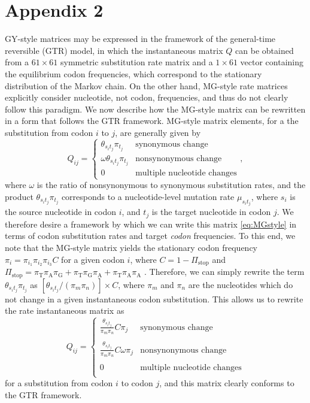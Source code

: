 \documentclass[11pt]{article}
\begin{document}
\section*{Appendix 2}
GY-style matrices may be expressed in the framework of the general-time reversible (GTR) model, in which the instantaneous matrix $Q$ can be obtained from a $61 \times 61$ symmetric substitution rate matrix and a $1\times61$ vector containing the equilibrium codon frequencies, which correspond to the stationary distribution of the Markov chain. On the other hand, MG-style rate matrices explicitly consider nucleotide, not codon, frequencies, and thus do not clearly follow this paradigm. We now describe how the MG-style matrix can be rewritten in a form that follows the GTR framework. 
MG-style matrix elements, for a the substitution from codon $i$ to $j$, are generally given by 
\begin{equation}\label{eq:MGstyle}
Q_{ij} = \left\{ 
\begin{array}{rl}
\theta_{s_it_j}\pi_{t_j}          &\mbox{synonymous change} \\
\omega \theta_{s_it_j}\pi_{t_j}   &\mbox{nonsynonymous change} \\
0                             &\mbox{multiple nucleotide changes}       
\end{array} \right. ,
\end{equation} where $\omega$ is the ratio of nonsynonymous to synonymous substitution rates, and the product $\theta_{s_it_j}\pi_{t_j}$ corresponds to a nucleotide-level mutation rate $\mu_{s_it_j}$, where $s_i$ is the source nucleotide in codon $i$, and $t_j$ is the target nucleotide in codon $j$. We therefore desire a framework by which we can write this matrix \eqref{eq:MGstyle} in terms of codon substitution rates and target \emph{codon} frequencies. To this end, we note that the MG-style matrix yields the stationary codon frequency $\pi_i = \pi_{i_1}\pi_{i_2}\pi_{i_3}C$ for a given codon $i$, where $C = 1 - \Pi_\text{stop}$ and $\Pi_\text{stop} = \pi_\text{T}\pi_\text{A}\pi_\text{G} + \pi_\text{T}\pi_\text{G}\pi_\text{A} + \pi_\text{T}\pi_\text{A}\pi_\text{A}$ \cite{MuseGaut1994}. Therefore, we can simply rewrite the term $\theta_{s_it_j}\pi_{t_j}$ as $[\theta_{s_it_j} / (\pi_m\pi_n)] \times C$, where $\pi_m$ and $\pi_n$ are the nucleotides which do not change in a given instantaneous codon substitution. This allows us to rewrite the rate instantaneous matrix as 
\begin{equation}
Q_{ij} = \left\{ 
\begin{array}{rl}
\frac{\theta_{s_it_j}}{\pi_m\pi_n}C\pi_j           &\mbox{synonymous change} \\\\
\frac{\theta_{s_it_j}}{\pi_m\pi_n}C\omega\pi_j     &\mbox{nonsynonymous change} \\\\
0                                              &\mbox{multiple nucleotide changes} \\           
\end{array} \right.
\end{equation} for a substitution from codon $i$ to codon $j$, and this matrix clearly conforms to the GTR framework.
		
\end{document}
